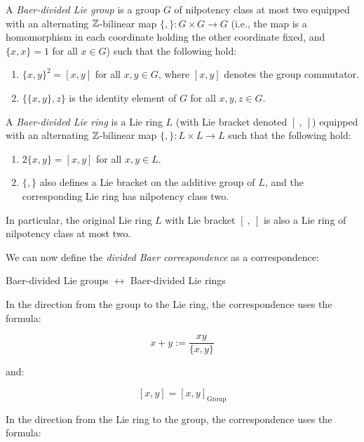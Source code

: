 \begin{definer}
  A {\em Baer-divided Lie group} is a group $G$ of nilpotency class at
  most two equipped with an alternating $\mathbb{Z}$-bilinear map $\{ , \}:G
  \times G \to G$ (i.e., the map is a homomorphism in each coordinate
  holding the other coordinate fixed, and $\{ x,x \} = 1$ for all $x
  \in G$) such that the following hold:

  \begin{enumerate}
  \item $\{ x,y \}^2 = [x,y]$ for all $x,y \in G$, where $[x,y]$
    denotes the group commutator.
  \item $\{ \{x,y \} , z \}$ is the identity element of $G$ for all
    $x,y,z \in G$.
  \end{enumerate}
\end{definer}

\begin{definer}
  A {\em Baer-divided Lie ring} is a Lie ring $L$ (with Lie bracket
  denoted $[ \ , \ ]$) equipped with an alternating $\mathbb{Z}$-bilinear map
  $\{ , \}: L \times L \to L$ such that the following hold:

  \begin{enumerate}
  \item $2\{ x, y \} = [x,y]$ for all $x,y \in L$.
  \item $\{ , \}$ also defines a Lie bracket on the additive group of
    $L$, and the corresponding Lie ring has nilpotency class two.
  \end{enumerate}

  In particular, the original Lie ring $L$ with Lie bracket $[ \ ,
    \ ]$ is also a Lie ring of nilpotency class at most two.
\end{definer}


We can now define the {\em divided Baer correspondence} as a
correspondence:

\begin{center}
  Baer-divided Lie groups $\leftrightarrow$ Baer-divided Lie rings
\end{center}

In the direction from the group to the Lie ring, the correspondence
uses the formula:

$$x + y := \frac{xy}{\{ x,y \}}$$

and:

$$[x,y] = [x,y]_{\text{Group}}$$

In the direction from the Lie ring to the group, the correspondence
uses the formula:


